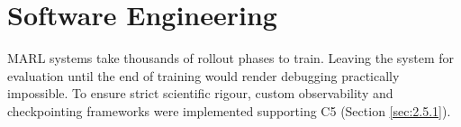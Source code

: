 



\section{Software Engineering}
\label{sec:3.8}

MARL systems take thousands of rollout phases to train.
Leaving the system for evaluation until the end of training would render debugging practically impossible.
To ensure strict scientific rigour, custom observability and checkpointing frameworks were implemented supporting C5 (Section \ref{sec:2.5.1}).

